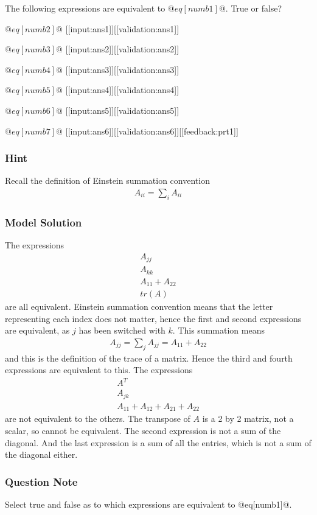 \documentclass[a4paper,10pt]{article}
\begin{document}
The following expressions are equivalent to \(@eq[numb1]@\). True or false?

\( @eq[numb2]@ \)   [[input:ans1]][[validation:ans1]]

\( @eq[numb3]@ \)   [[input:ans2]][[validation:ans2]]

\( @eq[numb4]@ \)   [[input:ans3]][[validation:ans3]]

\( @eq[numb5]@ \)   [[input:ans4]][[validation:ans4]]

\( @eq[numb6]@ \)   [[input:ans5]][[validation:ans5]]

\( @eq[numb7]@ \)   [[input:ans6]][[validation:ans6]][[feedback:prt1]]
\subsubsection{Hint}
Recall the definition of Einstein summation convention \begin{align*} A_{ii} = \sum_{i} A_{ii} \end{align*}
\subsubsection{Model Solution}
The expressions \begin{gather*} A_{jj} \\ A_{kk} \\ A_{11}+A_{22} \\ tr(A) \end{gather*} are all equivalent. Einstein summation convention means that the letter representing each index does not matter, hence the first and second expressions are equivalent, as \(j\) has been switched with \(k\). This summation means \begin{align*} A_{jj} = \sum_j A_{jj} = A_{11} + A_{22} \end{align*} and this is the definition of the trace of a matrix. Hence the third and fourth expressions are equivalent to this. The expressions \begin{gather*} A^{T} \\ A_{jk} \\ A_{11}+A_{12}+A_{21}+A_{22} \end{gather*} are not equivalent to the others. The transpose of \(A\) is a 2 by 2 matrix, not a scalar, so cannot be equivalent. The second expression is not a sum of the diagonal. And the last expression is a sum of all the entries, which is not a sum of the diagonal either.
\subsubsection{Question Note}
Select true and false as to which expressions are equivalent to @eq[numb1]@.
\end{document}
